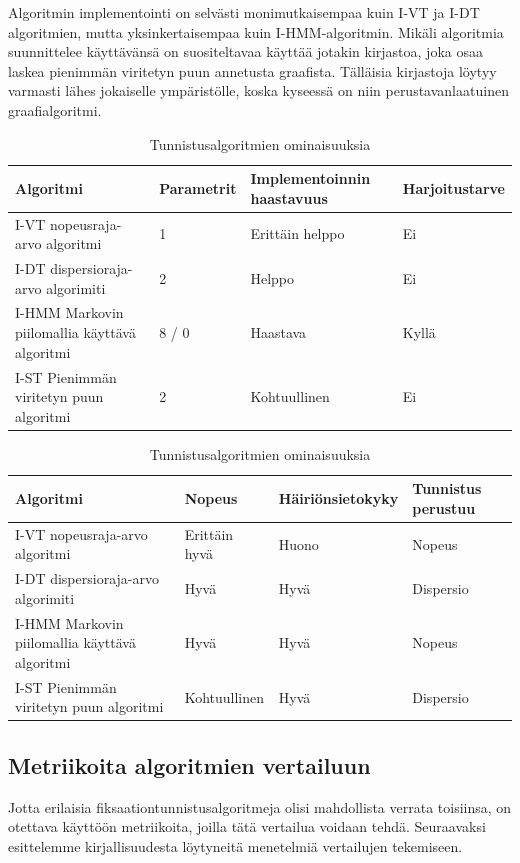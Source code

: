 Algoritmin implementointi on selvästi monimutkaisempaa kuin I-VT ja I-DT algoritmien, mutta yksinkertaisempaa kuin I-HMM-algoritmin. Mikäli algoritmia suunnittelee käyttävänsä on suositeltavaa käyttää jotakin kirjastoa, joka osaa laskea pienimmän viritetyn puun annetusta graafista. Tälläisia kirjastoja löytyy varmasti lähes jokaiselle ympäristölle, koska kyseessä on niin perustavanlaatuinen graafialgoritmi.


		\begin{table}
    \begin{tabular}{| p{4cm} | p{3cm} | p{3cm}| p{3.5cm} |}
    \hline
    Algoritmi & Parametrit & Implementoinnin haastavuus & Harjoitustarve \\ \hline
    I-VT nopeusraja-arvo algoritmi & 1 & Erittäin helppo & Ei\\ \hline
    I-DT dispersioraja-arvo algorimiti & 2 & Helppo & Ei \\ \hline
    I-HMM Markovin piilomallia käyttävä algoritmi & 8 / 0 & Haastava & Kyllä \\ \hline
		I-ST Pienimmän viritetyn puun algoritmi & 2 & Kohtuullinen & Ei \\
    \hline
    \end{tabular}
		
		\vspace*{0.2 cm}
		
    \begin{tabular}{| p{4cm} | p{3cm} | p{3cm} |  p{3.5cm} |}
    \hline
    Algoritmi & Nopeus & Häiriönsietokyky & Tunnistus perustuu  \\ \hline
    I-VT nopeusraja-arvo algoritmi  & Erittäin hyvä & Huono  & Nopeus \\ \hline
    I-DT dispersioraja-arvo algorimiti  & Hyvä & Hyvä & Dispersio\\ \hline
    I-HMM Markovin piilomallia käyttävä algoritmi & Hyvä & Hyvä & Nopeus \\ \hline
		I-ST Pienimmän viritetyn puun algoritmi & Kohtuullinen & Hyvä & Dispersio \\
    \hline
    \end{tabular}
		
		\caption{Tunnistusalgoritmien ominaisuuksia}
		\end{table}

\subsection{Metriikoita algoritmien vertailuun}
Jotta erilaisia fiksaationtunnistusalgoritmeja olisi mahdollista verrata toisiinsa, on otettava käyttöön metriikoita, joilla tätä vertailua voidaan tehdä. Seuraavaksi esittelemme kirjallisuudesta löytyneitä menetelmiä vertailujen tekemiseen.

